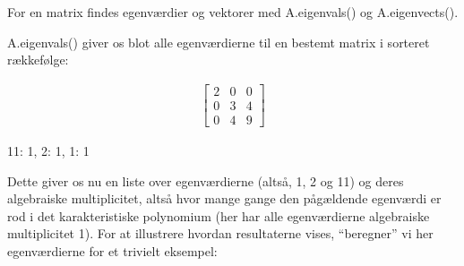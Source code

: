 \documentclass[letterpaper,10pt,english]{jupyterBook}
\begin{document}
For en matrix findes egenværdier og \sphinxhyphen{}vektorer med A.eigenvals() og A.eigenvects().

A.eigenvals() giver os blot alle egenværdierne til en bestemt matrix i sorteret rækkefølge:

\begin{sphinxVerbatim}[commandchars=\\\{\}]
  \PYG{p}{[}\PYG{p}{[}  \PYG{p}{]} \PYG{p}{[}  \PYG{p}{]} \PYG{p}{[}  \PYG{p}{]}\PYG{p}{]}
\end{sphinxVerbatim}
\begin{equation*}
\begin{split}\displaystyle \left[\begin{matrix}2 & 0 & 0\\0 & 3 & 4\\0 & 4 & 9\end{matrix}\right]\end{split}
\end{equation*}
\begin{sphinxVerbatim}[commandchars=\\\{\}]
\end{sphinxVerbatim}

\begin{sphinxVerbatim}[commandchars=\\\{\}]
\PYGZob{}11: 1, 2: 1, 1: 1\PYGZcb{}
\end{sphinxVerbatim}

Dette giver os nu en liste over egenværdierne (altså, 1, 2 og 11) og deres algebraiske multiplicitet, altså hvor mange gange den pågældende egenværdi er rod i det karakteristiske polynomium (her har alle egenværdierne algebraiske multiplicitet 1). For at illustrere hvordan resultaterne vises, “beregner” vi her egenværdierne for et trivielt eksempel:
\end{document}
